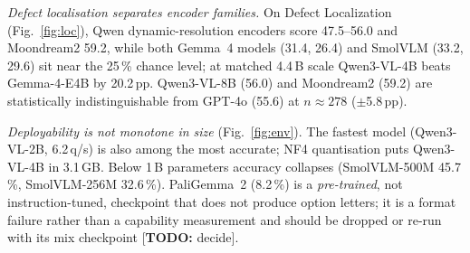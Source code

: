 \documentclass[conference]{IEEEtran}
\newcommand{\todo}[1]{\textcolor{red!70!black}{[\textbf{TODO:} #1]}}
\newcommand{\pp}{\,pp}          %
\begin{document}
\emph{Defect localisation separates encoder families.} On Defect Localization
(Fig.~\ref{fig:loc}), Qwen dynamic-resolution encoders score 47.5--56.0 and
Moondream2 59.2, while both Gemma~4 models (31.4, 26.4) and SmolVLM (33.2, 29.6)
sit near the 25\,\% chance level; at matched 4.4\,B scale Qwen3-VL-4B beats
Gemma-4-E4B by 20.2\pp. Qwen3-VL-8B (56.0) and Moondream2 (59.2) are statistically
indistinguishable from GPT-4o (55.6) at $n{\approx}278$ ($\pm$5.8\pp).

\emph{Deployability is not monotone in size} (Fig.~\ref{fig:env}). The fastest model
(Qwen3-VL-2B, 6.2\,q/s) is also among the most accurate; NF4 quantisation puts
Qwen3-VL-4B in 3.1\,GB. Below 1\,B parameters accuracy collapses (SmolVLM-500M
45.7\,\%, SmolVLM-256M 32.6\,\%). PaliGemma~2 (8.2\,\%) is a \emph{pre-trained},
not instruction-tuned, checkpoint that does not produce option letters; it is a
format failure rather than a capability measurement and should be dropped or
re-run with its mix checkpoint \todo{decide}.

\begin{table}[t]
\centering
\caption{Ten open models on the same 2{,}500 MMAD questions (0-shot, RTX~4060 Laptop).
MMAD-7 = unweighted mean of MMAD's seven task columns (balanced anomaly
discrimination). DL = Defect Localization. Latency per question, batch size 1.}
\label{tab:zoo}
\footnotesize
{}
\end{table}
\end{document}
